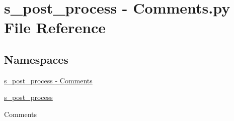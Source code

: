 \hypertarget{s__post__process_01-_01_comments_8py}{}\section{s\+\_\+post\+\_\+process -\/ Comments.\+py File Reference}
\label{s__post__process_01-_01_comments_8py}
\subsection*{Namespaces}
\begin{DoxyCompactItemize}
\item 
 \hyperlink{namespaces__post__process_01-_01_comments}{s\+\_\+post\+\_\+process -\/ Comments}
\item 
 \hyperlink{namespaces__post__process}{s\+\_\+post\+\_\+process}
\begin{DoxyCompactList}\small\item\em 
\begin{DoxyItemize}
\item Comments 
\end{DoxyItemize}\end{DoxyCompactList}\end{DoxyCompactItemize}
